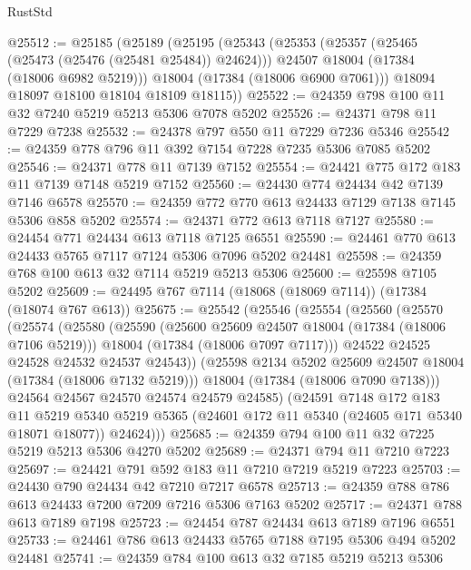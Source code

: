 \begin{lexlean}{RustStd}
\begin{coremodule}
@25512 := @25185
    (@25189
      (@25195
        (@25343
          (@25353
            (@25357 (@25465 (@25473 (@25476 (@25481 @25484)) @24624)))
            @24507
            @18004
            (@17384 (@18006 @6982 @5219)))
          @18004
          (@17384 (@18006 @6900 @7061)))
        @18094
        @18097
        @18100
        @18104
        @18109
        @18115))
@25522 := @24359 @798 @100 @11 @32 @7240 @5219 @5213 @5306 @7078 @5202
@25526 := @24371 @798 @11 @7229 @7238
@25532 := @24378 @797 @550 @11 @7229 @7236 @5346
@25542 := @24359 @778 @796 @11 @392 @7154 @7228 @7235 @5306 @7085 @5202
@25546 := @24371 @778 @11 @7139 @7152
@25554 := @24421 @775 @172 @183 @11 @7139 @7148 @5219 @7152
@25560 := @24430 @774 @24434 @42 @7139 @7146 @6578
@25570 := @24359 @772 @770 @613 @24433 @7129 @7138 @7145 @5306 @858 @5202
@25574 := @24371 @772 @613 @7118 @7127
@25580 := @24454 @771 @24434 @613 @7118 @7125 @6551
@25590 := @24461 @770 @613 @24433 @5765 @7117 @7124 @5306 @7096 @5202 @24481
@25598 := @24359 @768 @100 @613 @32 @7114 @5219 @5213 @5306
@25600 := @25598 @7105 @5202
@25609 := @24495 @767 @7114 (@18068 (@18069 @7114)) (@17384 (@18074 @767 @613))
@25675 := @25542
    (@25546
      (@25554
        (@25560
          (@25570
            (@25574
              (@25580
                (@25590
                  (@25600 @25609 @24507 @18004 (@17384 (@18006 @7106 @5219)))
                  @18004
                  (@17384 (@18006 @7097 @7117)))
                @24522
                @24525
                @24528
                @24532
                @24537
                @24543))
            (@25598 @2134 @5202 @25609 @24507 @18004 (@17384 (@18006 @7132 @5219)))
            @18004
            (@17384 (@18006 @7090 @7138)))
          @24564
          @24567
          @24570
          @24574
          @24579
          @24585)
        (@24591
          @7148
          @172
          @183
          @11
          @5219
          @5340
          @5219
          @5365
          (@24601 @172 @11 @5340 (@24605 @171 @5340 @18071 @18077))
          @24624)))
@25685 := @24359 @794 @100 @11 @32 @7225 @5219 @5213 @5306 @4270 @5202
@25689 := @24371 @794 @11 @7210 @7223
@25697 := @24421 @791 @592 @183 @11 @7210 @7219 @5219 @7223
@25703 := @24430 @790 @24434 @42 @7210 @7217 @6578
@25713 := @24359 @788 @786 @613 @24433 @7200 @7209 @7216 @5306 @7163 @5202
@25717 := @24371 @788 @613 @7189 @7198
@25723 := @24454 @787 @24434 @613 @7189 @7196 @6551
@25733 := @24461 @786 @613 @24433 @5765 @7188 @7195 @5306 @494 @5202 @24481
@25741 := @24359 @784 @100 @613 @32 @7185 @5219 @5213 @5306

\end{coremodule}
\end{lexlean}
